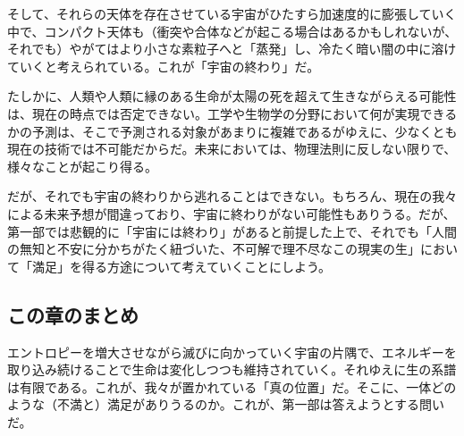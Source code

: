そして、それらの天体を存在させている宇宙がひたすら加速度的に膨張していく中で、コンパクト天体も（衝突や合体などが起こる場合はあるかもしれないが、それでも）やがてはより小さな素粒子へと「蒸発」し、冷たく暗い闇の中に溶けていくと考えられている。これが「宇宙の終わり」だ。

たしかに、人類や人類に縁のある生命が太陽の死を超えて生きながらえる可能性は、現在の時点では否定できない。工学や生物学の分野において何が実現できるかの予測は、そこで予測される対象があまりに複雑であるがゆえに、少なくとも現在の技術では不可能だからだ。未来においては、物理法則に反しない限りで、様々なことが起こり得る。

だが、それでも宇宙の終わりから逃れることはできない。もちろん、現在の我々による未来予想が間違っており、宇宙に終わりがない可能性もありうる。だが、第一部では悲観的に「宇宙には終わり」があると前提した上で、それでも「人間の無知と不安に分かちがたく紐づいた、不可解で理不尽なこの現実の生」において「満足」を得る方途について考えていくことにしよう。

\subsection{この章のまとめ}\label{ux3053ux306eux7ae0ux306eux307eux3068ux3081}

エントロピーを増大させながら滅びに向かっていく宇宙の片隅で、エネルギーを取り込み続けることで生命は変化しつつも維持されていく。それゆえに生の系譜は有限である。これが、我々が置かれている「真の位置」だ。そこに、一体どのような（不満と）満足がありうるのか。これが、第一部は答えようとする問いだ。
